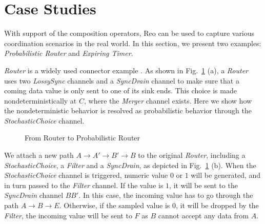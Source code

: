 \section{Case Studies}
\label{sec:casestudies}


With support of the composition operators, Reo can be used to capture various coordination scenarios in the real world. In this section, we present two examples: \emph{Probabilistic Router} and \emph{Expiring Timer}.


\begin{example}
\emph{Router} is a widely used connector example \cite{Baier2006a,Arbab2006}. As shown in Fig.~\ref{fig:router} (a), a \emph{Router} uses two \emph{LossySync} channels and a \emph{SyncDrain} channel to make sure that a coming data value is only sent to one of its sink ends. This choice is made nondeterministically at $C$, where the \emph{Merger} channel exists. Here we show how the nondeterministic behavior is resolved as probabilistic behavior through the \emph{StochasticChoice} channel.


\begin{figure}[t]
    \centering
    
    \caption{From Router to Probabilistic Router}
    \label{fig:router}
\end{figure}

We attach a new path $A\rightarrow A'\rightarrow B'\rightarrow B$ to the original \emph{Router}, including a \emph{StochasticChoice}, a \emph{Filter} and a \emph{SyncDrain}, as depicted in Fig.~\ref{fig:router} (b).
When the \emph{StochasticChoice} channel is triggered, numeric value $0$ or $1$ will be generated, and in turn passed to the \emph{Filter} channel. If the value is $1$, it will be sent to the \emph{SyncDrain} channel $BB'$. In this case, the incoming value has to go through the path $A\rightarrow B\rightarrow E$. Otherwise, if the sampled value is $0$, it will be dropped by the \emph{Filter}, the incoming value will be sent to $F$ as $B$ cannot accept any data from $A$.



\end{example}

